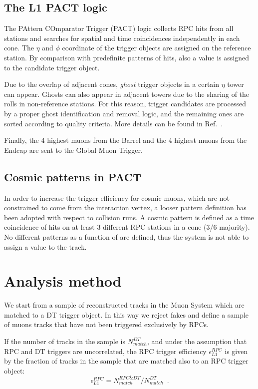 \subsection{The L1 PACT logic}
The PAttern COmparator Trigger (PACT) logic 
collects RPC hits from all stations and searches for
spatial and time coincidences independently
in each cone. The $\eta$ and $\phi$ coordinate of the trigger
objects are assigned on the reference station.
By comparison with predefinite patterns of hits, 
also a \pt value is assigned to the candidate trigger 
object. 

Due to the overlap of adjacent cones, 
{\em ghost} trigger objects in a certain $\eta$ tower 
can appear. Ghosts can also appear in adjacent towers 
due to the sharing of the rolls in non-reference stations. 
For this reason, trigger candidates are processed by a proper 
ghost identification and removal logic,
and the remaining ones are sorted according to quality criteria.
More details can be found in Ref.~\cite{ref:trig_tdr}.

Finally, the 4 highest \pt muons
from the Barrel and the 4 highest \pt muons from the
Endcap are sent to the Global Muon Trigger.

\subsection{Cosmic patterns in PACT}
In order to increase the trigger efficiency for 
cosmic muons, which are not constrained
to come from the interaction vertex, 
a looser pattern definition has been 
adopted with respect to collision runs.
A cosmic pattern is defined as a 
time coincidence of hits on at least
3 different RPC stations in a cone (3/6 majority).
No different patterns as a function 
of \pt are defined, thus the system is
not able to assign a \pt value 
to the track.

\section{Analysis method}
We start from a sample of reconstructed tracks 
in the Muon System which are matched to a DT 
trigger object. In this way we reject fakes 
and define a sample of muons tracks that have not been 
triggered exclusively by RPCs.

If the number of tracks in the sample is 
$N_{match}^{DT}$, and under the assumption
that RPC and DT triggers are uncorrelated,
the RPC trigger efficiency 
$\epsilon_{L1}^{RPC}$ is given by the fraction 
of tracks in the sample that are matched also 
to an RPC trigger object:
\begin{equation}
\epsilon_{L1}^{RPC} = N_{match}^{RPC\&DT}/N_{match}^{DT} \,\,\,.
\end{equation}

